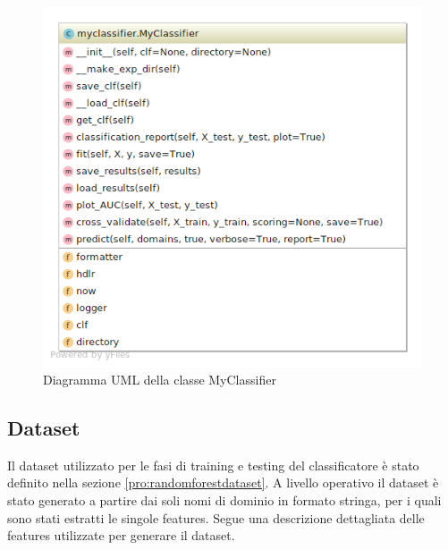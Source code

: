 \begin{figure}[!bp]
	\centering
	\includegraphics[width=0.7\columnwidth]{figures/uml_randomforest.png}
	\caption{Diagramma UML della classe MyClassifier 			\label{fig:uml_randomforest}}
\end{figure}


\subsection{Dataset}
Il dataset utilizzato per le fasi di training e testing del classificatore è stato definito nella sezione \ref{pro:randomforestdataset}. A livello operativo il dataset è stato generato a partire dai soli nomi di dominio in formato stringa, per i quali sono stati estratti le singole features. Segue una descrizione dettagliata delle features utilizzate per generare il dataset.

